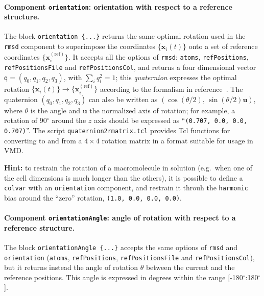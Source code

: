 \paragraph*{Component \texttt{orientation}: orientation with respect
  to a reference structure.}  The block \texttt{orientation~\{...\}}
returns the same optimal rotation used in the \texttt{rmsd} component
to superimpose the coordinates $\{\mathbf{x}_i(t)\}$ onto a set of
reference coordinates $\{\mathbf{x}_i^{\mathrm{(ref)}}\}$.  It accepts
all the options of \texttt{rmsd}: \texttt{atoms},
\texttt{refPositions}, \texttt{refPositionsFile} and
\texttt{refPositionsCol}, and returns a four dimensional vector
$\mathsf{q} = (q_0, q_1, q_2, q_3)$, with $\sum_i q_i^2 = 1$; this
\emph{quaternion} expresses the optimal rotation $\{\mathbf{x}_i(t)\}
\rightarrow \{\mathbf{x}_i^{\mathrm{(ref)}}\}$ according to the
formalism in reference~\cite{Coutsias2004}.  The quaternion $(q_0,
q_1, q_2, q_3)$ can also be written as $\left(\cos(\theta/2), \,
  \sin(\theta/2)\mathbf{u}\right)$, where $\theta$ is the angle and
$\mathbf{u}$ the normalized axis of rotation; for example, a rotation
of 90$^{\circ}$ around the $z$ axis should be expressed as
``\texttt{(0.707, 0.0, 0.0, 0.707)}''.  The script
\texttt{quaternion2rmatrix.tcl} provides Tcl functions for converting
to and from a $4\times{}4$ rotation matrix in a format suitable for
usage in VMD.

\textbf{Hint:} to restrain the rotation of a macromolecule in solution
(e.g.~when one of the cell dimensions is much longer than the others),
it is possible to define a \texttt{colvar} with an
\texttt{orientation} component, and restrain it throuh the
\texttt{harmonic} bias around the ``zero'' rotation, \texttt{(1.0,
  0.0, 0.0, 0.0)}.


\paragraph*{Component \texttt{orientationAngle}: angle of rotation with
  respect to a reference structure.}  The block
\texttt{orientationAngle~\{...\}} accepts the same options of
\texttt{rmsd} and \texttt{orientation} (\texttt{atoms},
\texttt{refPositions}, \texttt{refPositionsFile} and
\texttt{refPositionsCol}), but it returns instead the angle of
rotation $\theta$ between the current and the reference positions.
This angle is expressed in degrees within the range
[-180$^{\circ}$:180$^{\circ}$].



